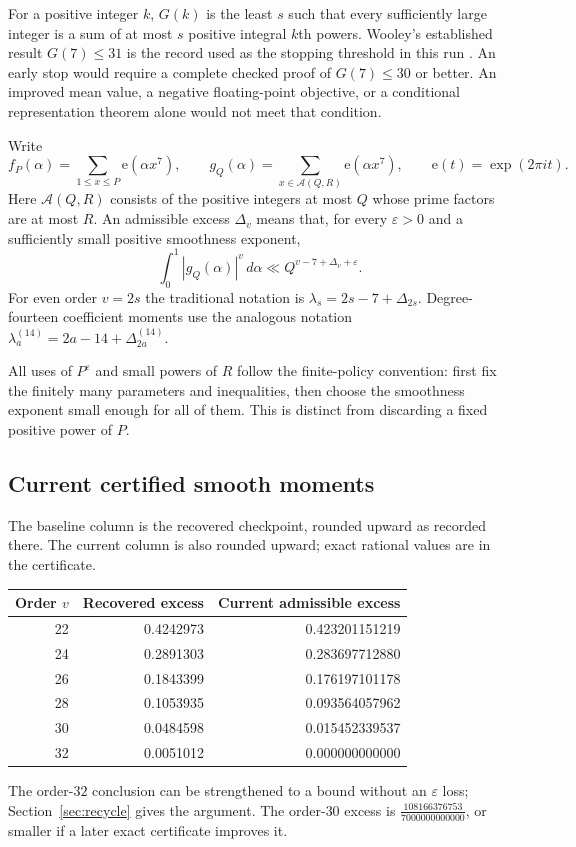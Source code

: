 \documentclass[11pt,letterpaper]{article}
\theoremstyle{remark}
\newcommand{\A}{\mathcal A}
\newcommand{\eps}{\varepsilon}
\newcommand{\dd}{\,d\alpha}
\newcommand{\e}{\mathrm e}
\newcommand{\CurrentDeltaThirtyExact}{\frac{108166376753}{7000000000000}}
\newcommand{\MomentTableRows}{22 & 0.4242973 & 0.423201151219 \\
24 & 0.2891303 & 0.283697712880 \\
26 & 0.1843399 & 0.176197101178 \\
28 & 0.1053935 & 0.093564057962 \\
30 & 0.0484598 & 0.015452339537 \\
32 & 0.0051012 & 0.000000000000 \\}
\begin{document}
For a positive integer $k$, $G(k)$ is the least $s$ such that every sufficiently
large integer is a sum of at most $s$ positive integral $k$th powers. Wooley's established result
$G(7)\le31$ is the record used as the stopping threshold in this run \cite{W16}.
An early stop would require a complete checked proof of $G(7)\le30$ or better.
An improved mean value, a negative floating-point objective, or a conditional
representation theorem alone would not meet that condition.

Write
\[
 f_P(\alpha)=\sum_{1\le x\le P}\e(\alpha x^7),\qquad
 g_Q(\alpha)=\sum_{x\in\A(Q,R)}\e(\alpha x^7),\qquad
 \e(t)=\exp(2\pi i t).
\]
Here $\A(Q,R)$ consists of the positive integers at most $Q$ whose prime factors are
at most $R$. An admissible excess $\Delta_v$ means that, for every $\eps>0$ and a
sufficiently small positive smoothness exponent,
\begin{equation}\label{eq:admissible}
 \int_0^1|g_Q(\alpha)|^v\dd\ll Q^{v-7+\Delta_v+\eps}.
\end{equation}
For even order $v=2s$ the traditional notation is
$\lambda_s=2s-7+\Delta_{2s}$. Degree-fourteen coefficient moments use the analogous
notation $\lambda_a^{(14)}=2a-14+\Delta_{2a}^{(14)}$.

All uses of $P^\eps$ and small powers of $R$ follow the finite-policy convention:
first fix the finitely many parameters and inequalities, then choose the smoothness
exponent small enough for all of them. This is distinct from discarding a fixed
positive power of $P$.

\subsection{Current certified smooth moments}

The baseline column is the recovered checkpoint, rounded upward as recorded there.
The current column is also rounded upward; exact rational values are in the certificate.
\begin{center}
\begin{tabular}{rrr}
\toprule
Order $v$ & Recovered excess & Current admissible excess\\
\midrule
\MomentTableRows
\bottomrule
\end{tabular}
\end{center}
The order-$32$ conclusion can be strengthened to a bound without an $\eps$ loss;
Section~\ref{sec:recycle} gives the argument. The order-$30$ excess is
$\CurrentDeltaThirtyExact$, or smaller if a later exact certificate improves it.
\end{document}
